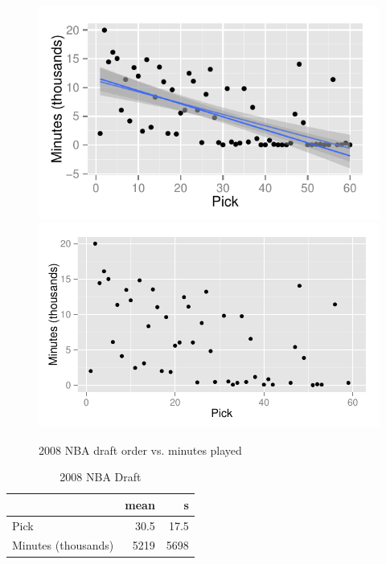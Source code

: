 \documentclass[letterpaper, landscape]{exam}
\begin{document}
\begin{questions}
        \begin{figure}[H]
          \centering
          \ifprintanswers
            \includegraphics[scale = 0.8]{figures/draft_with_regression.pdf}
          \else
            \includegraphics[scale = 0.8]{figures/draft.pdf}
          \fi
          \caption{2008 NBA draft order vs. minutes played}
          \label{fig:draft}
        \end{figure}

        \begin{table}[H]
          \centering
          \begin{tabular}{lrr}
            \toprule
                                & mean & s \\
            \midrule
            Pick                & 30.5 & 17.5 \\
            Minutes (thousands) & 5219 & 5698 \\
            \bottomrule
          \end{tabular}
          \caption{2008 NBA Draft}
        \end{table}


\end{questions}
\end{document}
